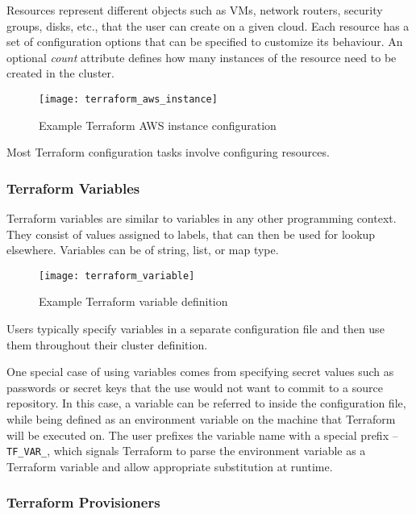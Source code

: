 Resources represent different objects such as VMs, network routers, security groups, disks, etc., that the user can create on a given cloud. Each resource has a set of configuration options that can be specified to customize its behaviour. An optional \emph{count} attribute defines how many instances of the resource need to be created in the cluster.

\begin{figure}[h]
\texttt{[image: terraform\_aws\_instance]}
\centering
\caption {Example Terraform AWS instance configuration}
\label{fig:terraform_aws_instance}
\end{figure}

Most Terraform configuration tasks involve configuring resources.

\subsubsection {Terraform Variables}

Terraform variables are similar to variables in any other programming context. They consist of values assigned to labels, that can then be used for lookup elsewhere. Variables can be of string, list, or map type.

\begin{figure}[h]
\texttt{[image: terraform\_variable]}
\centering
\caption {Example Terraform variable definition}
\label{fig:terraform_variable}
\end{figure}

Users typically specify variables in a separate configuration file and then use them throughout their cluster definition. 

One special case of using variables comes from specifying secret values such as passwords or secret keys that the use would not want to commit to a source repository. In this case, a variable can be referred to inside the configuration file, while being defined as an environment variable on the machine that Terraform will be executed on. The user prefixes the variable name with a special prefix -- \texttt{TF_VAR_}, which signals Terraform to parse the environment variable as a Terraform variable and allow appropriate substitution at runtime.

\subsubsection {Terraform Provisioners}

